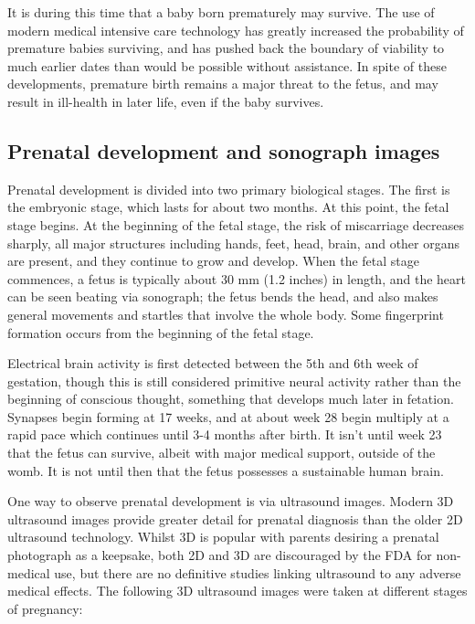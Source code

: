 \documentclass[12pt,a4paper,onecolumn]{article}
\begin{document}
It is during this time that a baby born prematurely may survive. The use of modern medical intensive
care technology has greatly increased the probability of premature babies surviving, and has pushed
back the boundary of viability to much earlier dates than would be possible without assistance. In
spite of these developments, premature birth remains a major threat to the fetus, and may result in
ill-health in later life, even if the baby survives.

\subsection{Prenatal development and sonograph images}

Prenatal development is divided into two primary biological stages. The first is the embryonic
stage, which lasts for about two months. At this point, the fetal stage begins. At the beginning of
the fetal stage, the risk of miscarriage decreases sharply, all major structures including hands,
feet, head, brain, and other organs are present, and they continue to grow and develop. When the
fetal stage commences, a fetus is typically about 30 mm (1.2 inches) in length, and the heart can be
seen beating via sonograph; the fetus bends the head, and also makes general movements and startles
that involve the whole body. Some fingerprint formation occurs from the beginning of the fetal
stage.

Electrical brain activity is first detected between the 5th and 6th week of gestation, though this
is still considered primitive neural activity rather than the beginning of conscious thought,
something that develops much later in fetation. Synapses begin forming at 17 weeks, and at about
week 28 begin multiply at a rapid pace which continues until 3-4 months after birth. It isn't until
week 23 that the fetus can survive, albeit with major medical support, outside of the womb. It is
not until then that the fetus possesses a sustainable human brain. 

One way to observe prenatal development is via ultrasound images. Modern 3D ultrasound images
provide greater detail for prenatal diagnosis than the older 2D ultrasound technology. Whilst 3D is
popular with parents desiring a prenatal photograph as a keepsake, both 2D and 3D are discouraged by
the FDA for non-medical use, but there are no definitive studies linking ultrasound to any adverse
medical effects. The following 3D ultrasound images were taken at different stages of pregnancy:
\end{document}
